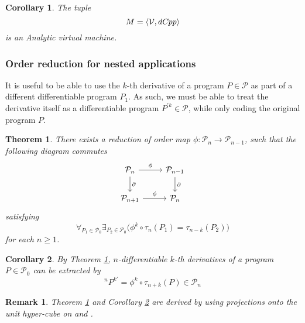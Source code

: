 \documentclass{article}
\newcommand{\VV}{\mathcal{V}}
\newcommand{\dP}{\mathcal{P}}
\newcommand{\D}{\partial}
\newcommand{\sumd}{\tau}
\newcommand{\dCpp}{dC\nolinebreak\hspace{-.05em}\raisebox{.4ex}{\tiny\bf +}\nolinebreak\hspace{-.10em}\raisebox{.4ex}{\tiny\bf p}}
\def\dCpp{{dC\nolinebreak[4]\hspace{-.05em}pp}}
\newtheorem{izrek}{Theorem}[section]
\newtheorem{opomba}{Remark}[section]
\newtheorem{corollary}{Corollary}[section]
\begin{document}
\begin{corollary}
The tuple 
\begin{equation}
M=\langle\VV,\dCpp\rangle
\end{equation}
is an Analytic virtual machine.
\end{corollary}

\subsubsection{Order reduction for nested applications}\label{sec:orderReduction}
 
 It is useful to be able to use the $k$-th derivative of a program $P\in\dP$ as part of a different differentiable program $P_1$. As such, we must be able to treat the derivative itself as a differentiable program $P^{\prime k}\in\dP$, while only coding the original program $P$. \cite[Section~5.2.2]{OperationalCalculus}
\begin{izrek}\label{izr:reductionMap}
There exists a reduction of order map $\phi:\dP_n\to \dP_{n-1}$, such that the
following  diagram commutes
\begin{equation}\label{eq:reductionMap}
\begin{tikzcd}
  \dP_n \arrow{r}{\phi} \arrow{d}{\D} & 
  \dP_{n-1} \arrow{d}{\D}\\
  \dP_{n+1} \arrow{r}{\phi} & 
  \dP_{n}
\end{tikzcd}
\end{equation}
satisfying
\begin{equation}
\forall_{P_1\in\dP_0}\exists_{P_2\in\dP_0}\Big(\phi^k\circ \sumd_n(P_1)=\sumd_{n-k}(P_2)\Big)
\end{equation}
for each $n\ge 1$.
\end{izrek}  
\begin{corollary}\label{cor:extraxtDerivatives}
By Theorem \ref{izr:reductionMap}, $n$-differentiable $k$-th derivatives of a program $P\in\dP_0$ can be extracted by
\begin{equation}
^{n}P^{k\prime}=\phi^k\circ \sumd_{n+k}(P)\in\dP_n
\end{equation}
\end{corollary}  
\begin{opomba}
Theorem \ref{izr:reductionMap} and Corollary \ref{cor:extraxtDerivatives} are derived by using projections onto the unit hyper-cube on \cite[Theorem~5.7]{OperationalCalculus} and \cite[Corollary~5.5]{OperationalCalculus}.
\end{opomba}  
\end{document}
